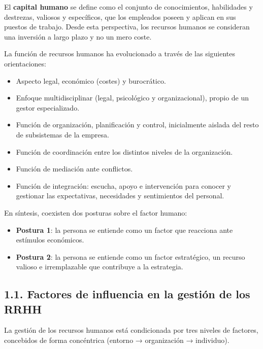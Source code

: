 \documentclass[12pt]{book} %
\providecommand{\tightlist}{%
  \setlength{\itemsep}{0pt}\setlength{\parskip}{0pt}}
\begin{document}
El \textbf{capital humano} se define como el conjunto de conocimientos,
habilidades y destrezas, valiosos y específicos, que los empleados
poseen y aplican en sus puestos de trabajo. Desde esta perspectiva, los
recursos humanos se consideran una inversión a largo plazo y no un mero
coste.

La función de recursos humanos ha evolucionado a través de las
siguientes orientaciones:

\begin{itemize}
\tightlist
\item
  Aspecto legal, económico (costes) y burocrático.
\item
  Enfoque multidisciplinar (legal, psicológico y organizacional), propio
  de un gestor especializado.
\item
  Función de organización, planificación y control, inicialmente aislada
  del resto de subsistemas de la empresa.
\item
  Función de coordinación entre los distintos niveles de la
  organización.
\item
  Función de mediación ante conflictos.
\item
  Función de integración: escucha, apoyo e intervención para conocer y
  gestionar las expectativas, necesidades y sentimientos del personal.
\end{itemize}

En síntesis, coexisten dos posturas sobre el factor humano:

\begin{itemize}
\tightlist
\item
  \textbf{Postura 1}: la persona se entiende como un factor que
  reacciona ante estímulos económicos.
\item
  \textbf{Postura 2}: la persona se entiende como un factor estratégico,
  un recurso valioso e irremplazable que contribuye a la estrategia.
\end{itemize}

\hypertarget{factores-de-influencia-en-la-gestiuxf3n-de-los-rrhh}{%
\subsection{1.1. Factores de influencia en la gestión de los
RRHH}\label{factores-de-influencia-en-la-gestiuxf3n-de-los-rrhh}}

La gestión de los recursos humanos está condicionada por tres niveles de
factores, concebidos de forma concéntrica (entorno → organización →
individuo).
\end{document}
